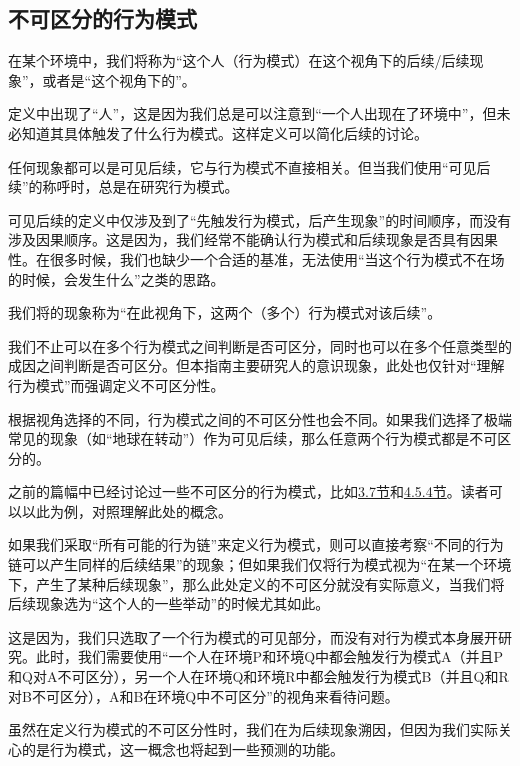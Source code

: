 \subsection{不可区分的行为模式}
在某个环境中，我们将称为“这个人（行为模式）在这个视角下的后续/后续现象”，或者是“这个视角下的”。
\begin{explain}
定义中出现了“人”，这是因为我们总是可以注意到“一个人出现在了环境中”，但未必知道其具体触发了什么行为模式。这样定义可以简化后续的讨论。

任何现象都可以是可见后续，它与行为模式不直接相关。但当我们使用“可见后续”的称呼时，总是在研究行为模式。

可见后续的定义中仅涉及到了“先触发行为模式，后产生现象”的时间顺序，而没有涉及因果顺序。这是因为，我们经常不能确认行为模式和后续现象是否具有因果性。在很多时候，我们也缺少一个合适的基准，无法使用“当这个行为模式不在场的时候，会发生什么”之类的思路。
\end{explain}
我们将的现象称为“在此视角下，这两个（多个）行为模式对该后续”。
\begin{explain}
我们不止可以在多个行为模式之间判断是否可区分，同时也可以在多个任意类型的成因之间判断是否可区分。但本指南主要研究人的意识现象，此处也仅针对“理解行为模式”而强调定义不可区分性。

根据视角选择的不同，行为模式之间的不可区分性也会不同。如果我们选择了极端常见的现象（如“地球在转动”）作为可见后续，那么任意两个行为模式都是不可区分的。

之前的篇幅中已经讨论过一些不可区分的行为模式，比如\hyperref[sec:情绪、感受与其分析与处理方法]{3.7节}和\hyperref[sec:指挥现象的一个实例解读]{4.5.4节}。读者可以以此为例，对照理解此处的概念。

如果我们采取“所有可能的行为链”来定义行为模式，则可以直接考察“不同的行为链可以产生同样的后续结果”的现象；但如果我们仅将行为模式视为“在某一个环境下，产生了某种后续现象”，那么此处定义的不可区分就没有实际意义，当我们将后续现象选为“这个人的一些举动”的时候尤其如此。

这是因为，我们只选取了一个行为模式的可见部分，而没有对行为模式本身展开研究。此时，我们需要使用“一个人在环境P和环境Q中都会触发行为模式A（并且P和Q对A不可区分），另一个人在环境Q和环境R中都会触发行为模式B（并且Q和R对B不可区分），A和B在环境Q中不可区分”的视角来看待问题。

虽然在定义行为模式的不可区分性时，我们在为后续现象溯因，但因为我们实际关心的是行为模式，这一概念也将起到一些预测的功能。
\end{explain}
